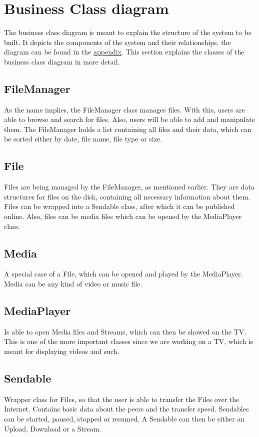 \clearpage

\section{Business Class diagram}
The business class diagram is meant to explain the structure of the system to be built. It depicts the components of the system
and their relationships, the diagram can be found in the \hyperref[fig:business_class]{appendix}. This section explains the classes of the business class diagram in more detail.

\subsection{FileManager}
As the name implies, the FileManager class manages files. With this, users are able to browse and search for files.
Also, users will be able to add and manipulate them. The FileManager holds a list containing all files and their data, which can be sorted either
by date, file name, file type or size.

\subsection{File}
Files are being managed by the FileManager, as mentioned earlier. They are data structures for files on the disk, containing all necessary 
information about them. Files can be wrapped into a Sendable class, after which it can be published online. Also, files can be media files which
can be opened by the MediaPlayer class.

\subsection{Media}
A special case of a File, which can be opened and played by the MediaPlayer. Media can be any kind of video or music file.

\subsection{MediaPlayer}
Is able to open Media files and Streams, which can then be showed on the TV. This is one of the more important classes since we are working 
on a TV, which is meant for displaying videos and such.

\subsection{Sendable}
Wrapper class for Files, so that the user is able to transfer the Files over the Internet. Contains basic data about the peers and the transfer speed.
Sendables can be started, paused, stopped or resumed. A Sendable can then be either an Upload, Download or a Stream.

